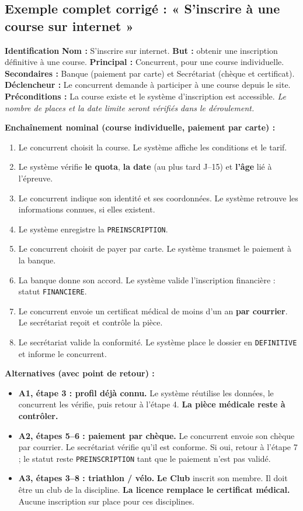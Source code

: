 \documentclass[10pt,a4paper]{article}
\begin{document}
\subsection{Exemple complet corrigé : « S'inscrire à une course sur internet »}
\begin{exobox}
\textbf{Identification}\newline
\textbf{Nom :} S'inscrire sur internet. \textbf{But :} obtenir une inscription définitive à une course.\newline
\textbf{Principal :} Concurrent, pour une course individuelle. \textbf{Secondaires :} Banque (paiement par carte) et Secrétariat (chèque et certificat).\newline
\textbf{Déclencheur :} Le concurrent demande à participer à une course depuis le site.\newline
\textbf{Préconditions :} La course existe et le système d'inscription est accessible. \emph{Le nombre de places et la date limite seront vérifiés dans le déroulement.}
\end{exobox}
\textbf{Enchaînement nominal (course individuelle, paiement par carte) :}
\begin{enumerate}[label=\textbf{\arabic*.}]
\item Le concurrent choisit la course. Le système affiche les conditions et le tarif.
\item Le système vérifie \textbf{le quota}, \textbf{la date} (au plus tard J--15) et \textbf{l'âge} lié à l'épreuve.
\item Le concurrent indique son identité et ses coordonnées. Le système retrouve les informations connues, si elles existent.
\item Le système enregistre la \texttt{PREINSCRIPTION}.
\item Le concurrent choisit de payer par carte. Le système transmet le paiement à la banque.
\item La banque donne son accord. Le système valide l'inscription financière : statut \texttt{FINANCIERE}.
\item Le concurrent envoie un certificat médical de moins d'un an \textbf{par courrier}. Le secrétariat reçoit et contrôle la pièce.
\item Le secrétariat valide la conformité. Le système place le dossier en \texttt{DEFINITIVE} et informe le concurrent.
\end{enumerate}
\textbf{Alternatives (avec point de retour) :}
\begin{itemize}
\item \textbf{A1, étape 3 : profil déjà connu.} Le système réutilise les données, le concurrent les vérifie, puis retour à l'étape 4. \textbf{La pièce médicale reste à contrôler.}
\item \textbf{A2, étapes 5--6 : paiement par chèque.} Le concurrent envoie son chèque par courrier. Le secrétariat vérifie qu'il est conforme. Si oui, retour à l'étape 7 ; le statut reste \texttt{PREINSCRIPTION} tant que le paiement n'est pas validé.
\item \textbf{A3, étapes 3--8 : triathlon / vélo.} \textbf{Le Club} inscrit son membre. Il doit être un club de la discipline. \textbf{La licence remplace le certificat médical.} Aucune inscription sur place pour ces disciplines.
\end{itemize}
\end{document}
